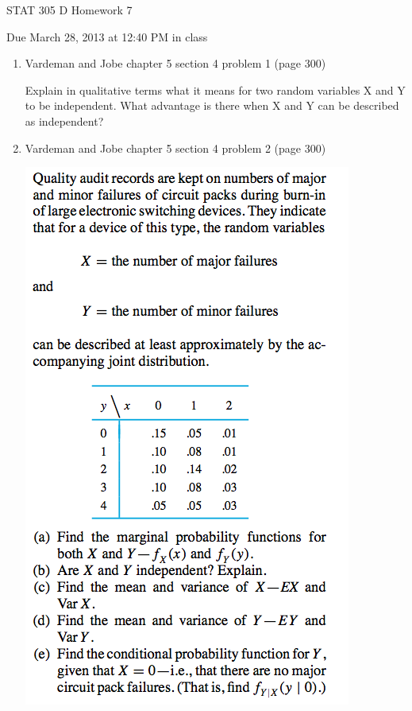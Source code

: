 \documentclass{article}\usepackage{graphicx, color}
\numberwithin{equation}{section}
\begin{document}
\begin{flushleft}
\begin{center} \LARGE
STAT 305 D Homework 7
\end{center}
\begin{center} \Large
Due March 28, 2013 at 12:40 PM in class
\end{center}
\normalsize


\begin{enumerate}[1. ]

\item Vardeman and Jobe chapter 5 section 4 problem 1 (page 300)

Explain in qualitative terms what it means for two random variables X and Y to be independent. What advantage is there when X and Y can be described as independent?

\item Vardeman and Jobe chapter 5 section 4 problem 2 (page 300)

 \includegraphics{../../fig/h7p2.png}


\end{enumerate}
\end{flushleft}
\end{document}
